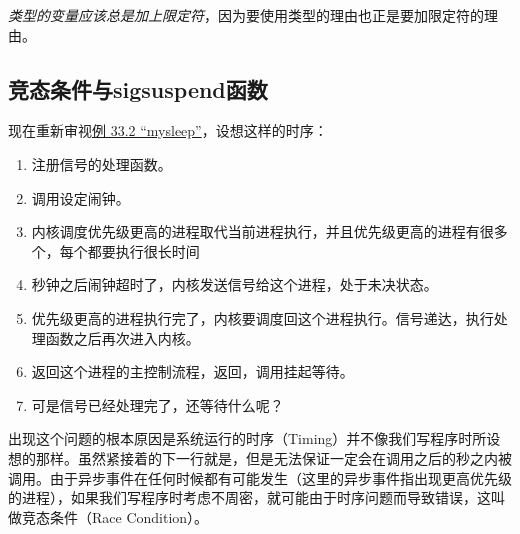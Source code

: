 \emph{类型的变量应该总是加上限定符}，因为要使用类型的理由也正是要加限定符的理由。


\subsection{竞态条件与sigsuspend函数}
%


现在重新审视\hyperlink{db.ch33s04.id2885725}{例 33.\BookSplit{}2 “mysleep”}，设想这样的时序：


\begin{enumerate}

\item 注册信号的处理函数。

\item 调用设定闹钟。

\item 内核调度优先级更高的进程取代当前进程执行，并且优先级更高的进程有很多个，每个都要执行很长时间

\item {}秒钟之后闹钟超时了，内核发送信号给这个进程，处于未决状态。

\item 优先级更高的进程执行完了，内核要调度回这个进程执行。信号递达，执行处理函数之后再次进入内核。

\item 返回这个进程的主控制流程，返回，调用挂起等待。

\item 可是信号已经处理完了，还等待什么呢？
\end{enumerate}


出现这个问题的根本原因是系统运行的时序（Timing）并不像我们写程序时所设想的那样。虽然紧接着的下一行就是，但是无法保证一定会在调用之后的秒之内被调用。由于异步事件在任何时候都有可能发生（这里的异步事件指出现更高优先级的进程），如果我们写程序时考虑不周密，就可能由于时序问题而导致错误，这叫做竞态条件（Race Condition）。



